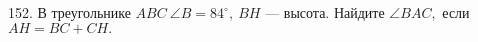 152. В треугольнике $ABC\ \angle B = 84^\circ,\ BH$ --- высота. Найдите $\angle BAC,$ если $AH=BC+CH.$\\
